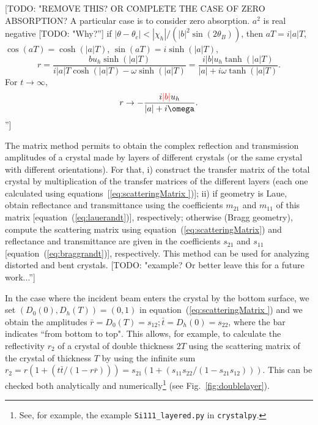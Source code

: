 \documentclass[preprint]{iucr}              %
\newcommand{\todo}[1]{{\color{red}[TODO: "#1'']}}
\newcommand{\inblue}[1]{{\color{blue}#1}}
\newcommand{\inred}[1]{{\color{red}#1}}
\begin{document}
\todo{REMOVE THIS? OR COMPLETE THE CASE OF ZERO ABSORPTION? A particular case is to consider zero absorption. 
$a^2$ is real negative \todo{Why?} if $|\theta-\theta_c|<|\chi_h|/(|b|^2 \sin(2 \theta_B))$, then $aT=i |a| T$, $\cos(a T)=\cosh(|a|T)$, $\sin(a T)=i \sinh(|a|T)$, 
\begin{equation}
    r = \frac{b u_h \sinh(|a|T)}{i |a|T \cosh(|a|T)- \omega
    \sinh(|a|T)}=
\frac{i |b| u_h \tanh(|a|T)}{|a|+ i \omega \tanh(|a|T)}.
\end{equation}
For $t \rightarrow \infty$, 
\begin{equation}
    r \rightarrow - \frac{i \inred{|b|} u_h}{|a|+ i \omega} .
\end{equation}
}

\inblue{
The matrix method permits to obtain the complex reflection and transmission amplitudes of a crystal made by layers of different crystals (or the same crystal with different orientations). For that,
i) construct the transfer matrix of the total crystal by multiplication of the transfer matrices of the different layers (each one calculated using equations~[\ref{eq:scatteringMatrix })];
ii) if geometry is Laue, obtain reflectance and transmittance using the coefficients $m_{21}$ and $m_{11}$ of this matrix [equation~(\ref{eq:lauerandt})], respectively; otherwise (Bragg geometry), compute the scattering matrix using equation~(\ref{eq:scatteringMatrix}) and reflectance and transmittance are given in the coefficients $s_{21}$ and $s_{11}$ [equation~(\ref{eq:braggrandt})], respectively.  This method can be used for analyzing distorted and bent crystals.
}\todo{example? Or better leave this for a future work...}

\inblue{In the case where the incident beam enters the crystal by the bottom surface, we set $(D_0(0),D_h(T))=(0,1)$ in equation~(\ref{eq:scatteringMatrix }) and  we obtain the amplitudes $\bar{r}=D_0(T)=s_{12}; \bar{t}=D_h(0)=s_{22}$, where the bar indicates ``from bottom to top". This allows, for example, to calculate the reflectivity $r_{2}$ of a crystal of double thickness $2 T$ using the scattering matrix of the crystal of thickness $T$
by using the infinite sum $r_2=r(1 + (t \bar{t} / (1-r \bar{r})))=s_{21}(1 + (s_{11} s_{22} / (1-s_{21} s_{12})))$. This can be checked both analytically and numerically\footnote{See, for example, the example {\tt Si111\_layered.py} in {\tt crystalpy}.} (see Fig.~\ref{fig:doublelayer}).
}
\end{document}

